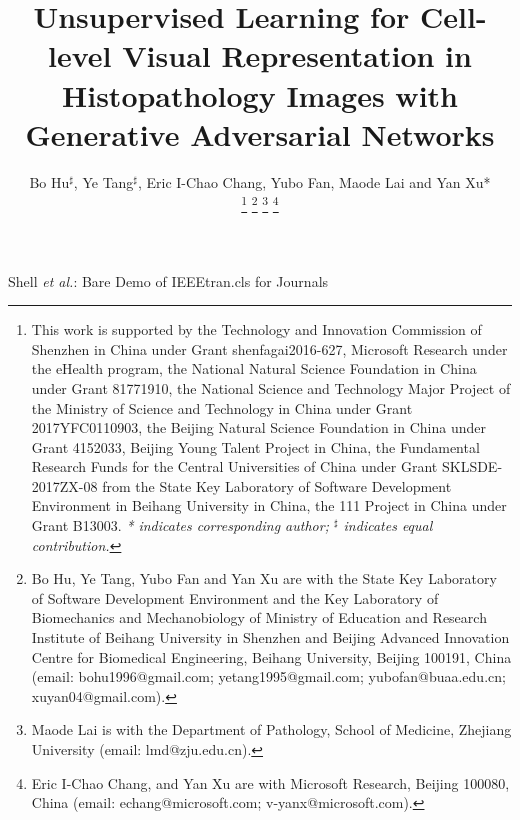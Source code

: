 \documentclass[journal]{IEEEtran}
\begin{document}
\title{Unsupervised Learning for Cell-level Visual Representation in Histopathology Images with Generative Adversarial Networks}

\author{Bo Hu$^\sharp$, Ye Tang$^\sharp$, Eric I-Chao Chang, Yubo Fan, Maode Lai and Yan Xu*

\thanks{This work is supported by the Technology and Innovation Commission of Shenzhen in China under Grant shenfagai2016-627, Microsoft Research under the eHealth program, the National Natural Science Foundation in China under Grant 81771910, the National Science and Technology Major Project of the Ministry of Science and Technology in China under Grant 2017YFC0110903, the Beijing Natural Science Foundation in China under Grant 4152033, Beijing Young Talent Project in China, the Fundamental Research Funds for the Central Universities of China under Grant SKLSDE-2017ZX-08 from the State Key Laboratory of Software Development Environment in Beihang University in China, the 111 Project in China under Grant B13003. \emph{* indicates corresponding author; $^\sharp$ indicates equal contribution.}}
\thanks{Bo Hu, Ye Tang, Yubo Fan and Yan Xu are with the State Key Laboratory of Software Development Environment and the Key Laboratory of Biomechanics and Mechanobiology of Ministry of Education and Research Institute of Beihang University in Shenzhen and Beijing Advanced Innovation Centre for Biomedical Engineering, Beihang University, Beijing 100191, China (email: bohu1996@gmail.com; yetang1995@gmail.com; yubofan@buaa.edu.cn; xuyan04@gmail.com).}
\thanks{Maode Lai is with the Department of Pathology, School of Medicine, Zhejiang
University (email: lmd@zju.edu.cn).}
\thanks{Eric I-Chao Chang, and Yan Xu are with Microsoft Research, Beijing 100080, China (email: echang@microsoft.com; v-yanx@microsoft.com).}
}





\markboth{}%
{Shell \MakeLowercase{\textit{et al.}}: Bare Demo of IEEEtran.cls for Journals}











\maketitle
\end{document}
